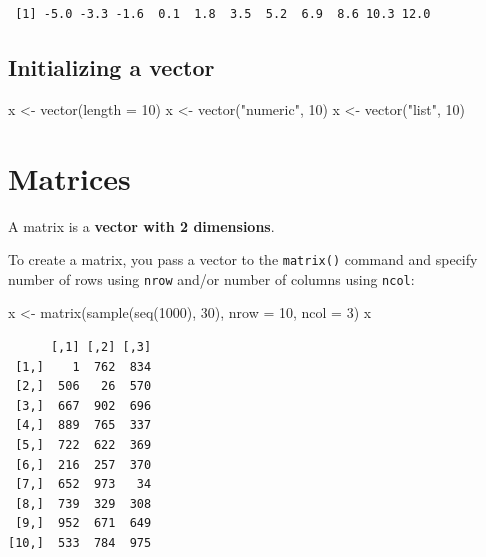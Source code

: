 \documentclass[
]{book}
\newenvironment{Shaded}{\begin{snugshade}}{\end{snugshade}}
\newcommand{\AttributeTok}[1]{\textcolor[rgb]{0.77,0.63,0.00}{#1}}
\newcommand{\DecValTok}[1]{\textcolor[rgb]{0.00,0.00,0.81}{#1}}
\newcommand{\FunctionTok}[1]{\textcolor[rgb]{0.00,0.00,0.00}{#1}}
\newcommand{\NormalTok}[1]{#1}
\newcommand{\OtherTok}[1]{\textcolor[rgb]{0.56,0.35,0.01}{#1}}
\newcommand{\StringTok}[1]{\textcolor[rgb]{0.31,0.60,0.02}{#1}}
\begin{document}
\begin{verbatim}
 [1] -5.0 -3.3 -1.6  0.1  1.8  3.5  5.2  6.9  8.6 10.3 12.0
\end{verbatim}

\hypertarget{initializing-a-vector}{%
\subsection{Initializing a vector}\label{initializing-a-vector}}

\begin{Shaded}
\begin{Highlighting}[]
\NormalTok{x }\OtherTok{\textless{}{-}} \FunctionTok{vector}\NormalTok{(}\AttributeTok{length =} \DecValTok{10}\NormalTok{)}
\NormalTok{x }\OtherTok{\textless{}{-}} \FunctionTok{vector}\NormalTok{(}\StringTok{"numeric"}\NormalTok{, }\DecValTok{10}\NormalTok{)}
\NormalTok{x }\OtherTok{\textless{}{-}} \FunctionTok{vector}\NormalTok{(}\StringTok{"list"}\NormalTok{, }\DecValTok{10}\NormalTok{)}
\end{Highlighting}
\end{Shaded}

\hypertarget{matrices}{%
\section{Matrices}\label{matrices}}

A matrix is a \textbf{vector with 2 dimensions}.

To create a matrix, you pass a vector to the \texttt{matrix()} command and specify number of rows using \texttt{nrow} and/or number of columns using \texttt{ncol}:

\begin{Shaded}
\begin{Highlighting}[]
\NormalTok{x }\OtherTok{\textless{}{-}} \FunctionTok{matrix}\NormalTok{(}\FunctionTok{sample}\NormalTok{(}\FunctionTok{seq}\NormalTok{(}\DecValTok{1000}\NormalTok{), }\DecValTok{30}\NormalTok{),}
            \AttributeTok{nrow =} \DecValTok{10}\NormalTok{, }\AttributeTok{ncol =} \DecValTok{3}\NormalTok{)}
\NormalTok{x}
\end{Highlighting}
\end{Shaded}

\begin{verbatim}
      [,1] [,2] [,3]
 [1,]    1  762  834
 [2,]  506   26  570
 [3,]  667  902  696
 [4,]  889  765  337
 [5,]  722  622  369
 [6,]  216  257  370
 [7,]  652  973   34
 [8,]  739  329  308
 [9,]  952  671  649
[10,]  533  784  975
\end{verbatim}
\end{document}

